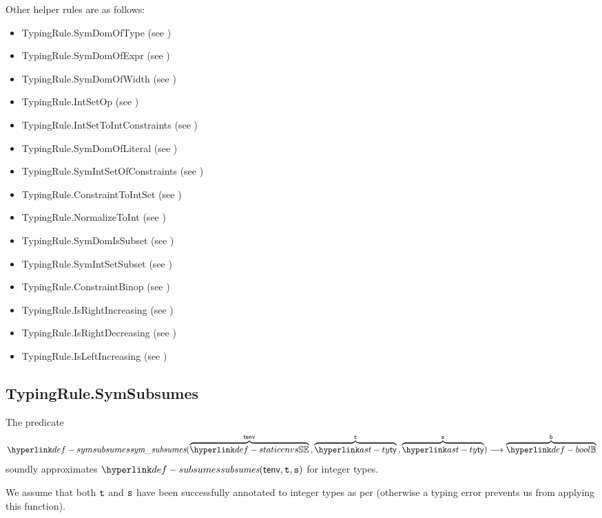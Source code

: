 Other helper rules are as follows:
\begin{itemize}
  \item TypingRule.SymDomOfType (see )
  \item TypingRule.SymDomOfExpr (see )
  \item TypingRule.SymDomOfWidth (see )
  \item TypingRule.IntSetOp (see )
  \item TypingRule.IntSetToIntConstraints (see )
  \item TypingRule.SymDomOfLiteral (see )
  \item TypingRule.SymIntSetOfConstraints (see )
  \item TypingRule.ConstraintToIntSet (see )
  \item TypingRule.NormalizeToInt (see )
  \item TypingRule.SymDomIsSubset (see )
  \item TypingRule.SymIntSetSubset (see )
  \item TypingRule.ConstraintBinop (see )
  \item TypingRule.IsRightIncreasing (see )
  \item TypingRule.IsRightDecreasing (see )
  \item TypingRule.IsLeftIncreasing (see )
\end{itemize}

\subsection{TypingRule.SymSubsumes \label{sec:TypingRule.SymSubsumes}}
\hypertarget{def-symsubsumes}{}
The predicate
\[
  \symsubsumes(\overname{\staticenvs}{\tenv} \aslsep \overname{\ty}{\vt} \aslsep \overname{\ty}{\vs})
  \aslto \overname{\Bool}{\vb}
\]
soundly approximates $\subsumes(\tenv, \vt, \vs)$ for integer types.
\ProseOtherwiseTypeError

We assume that both $\texttt{t}$ and $\texttt{s}$ have been successfully annotated to integer types as per 
(otherwise a typing error prevents us from applying this function).

